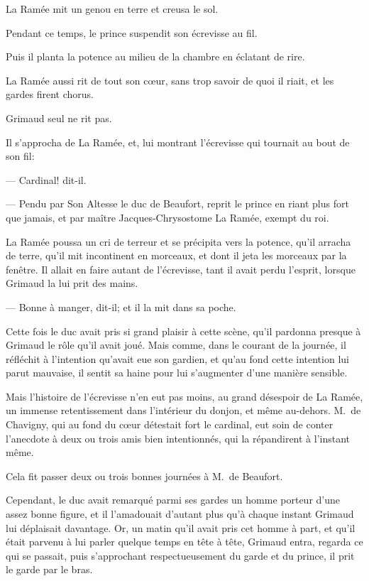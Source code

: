 La Ramée mit un genou en terre et creusa le sol.

Pendant ce temps, le prince suspendit son écrevisse au fil.

Puis il planta la potence au milieu de la chambre en éclatant de rire.

La Ramée aussi rit de tout son cœur, sans trop savoir de quoi il riait, et les gardes firent chorus.

Grimaud seul ne rit pas.

Il s'approcha de La Ramée, et, lui montrant l'écrevisse qui tournait au bout de son fil:

— Cardinal! dit-il.

— Pendu par Son Altesse le duc de Beaufort, reprit le prince en riant plus fort que jamais, et par maître Jacques-Chrysostome La Ramée, exempt du roi.

La Ramée poussa un cri de terreur et se précipita vers la potence, qu'il arracha de terre, qu'il mit incontinent en morceaux, et dont il jeta les morceaux par la fenêtre. Il allait en faire autant de l'écrevisse, tant il avait perdu l'esprit, lorsque Grimaud la lui prit des mains.

— Bonne à manger, dit-il; et il la mit dans sa poche.

Cette fois le duc avait pris si grand plaisir à cette scène, qu'il pardonna presque à Grimaud le rôle qu'il avait joué. Mais comme, dans le courant de la journée, il réfléchit à l'intention qu'avait eue son gardien, et qu'au fond cette intention lui parut mauvaise, il sentit sa haine pour lui s'augmenter d'une manière sensible.

Mais l'histoire de l'écrevisse n'en eut pas moins, au grand désespoir de La Ramée, un immense retentissement dans l'intérieur du donjon, et même au-dehors. M.~de Chavigny, qui au fond du cœur détestait fort le cardinal, eut soin de conter l'anecdote à deux ou trois amis bien intentionnés, qui la répandirent à l'instant même.

Cela fit passer deux ou trois bonnes journées à M.~de Beaufort.

Cependant, le duc avait remarqué parmi ses gardes un homme porteur d'une assez bonne figure, et il l'amadouait d'autant plus qu'à chaque instant Grimaud lui déplaisait davantage. Or, un matin qu'il avait pris cet homme à part, et qu'il était parvenu à lui parler quelque temps en tête à tête, Grimaud entra, regarda ce qui se passait, puis s'approchant respectueusement du garde et du prince, il prit le garde par le bras.

